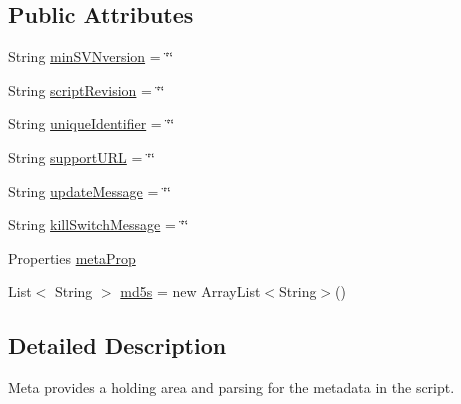 \subsection*{Public Attributes}
\begin{DoxyCompactItemize}
\item 
String \hyperlink{class_c_a_s_u_a_l_1_1caspac_1_1_script_1_1meta_a5d47eed446b14af2514c6937a4202669}{min\-S\-V\-Nversion} = \char`\"{}\char`\"{}
\item 
String \hyperlink{class_c_a_s_u_a_l_1_1caspac_1_1_script_1_1meta_a57752ff86ad97dc0123eaae1555dbfd5}{script\-Revision} = \char`\"{}\char`\"{}
\item 
String \hyperlink{class_c_a_s_u_a_l_1_1caspac_1_1_script_1_1meta_a66b81ac4a19e9bcd67f13776d05c03e9}{unique\-Identifier} = \char`\"{}\char`\"{}
\item 
String \hyperlink{class_c_a_s_u_a_l_1_1caspac_1_1_script_1_1meta_ac61f54a156af56a97ddebc1b97c6de02}{support\-U\-R\-L} = \char`\"{}\char`\"{}
\item 
String \hyperlink{class_c_a_s_u_a_l_1_1caspac_1_1_script_1_1meta_a0a8a286ab3eb83b8a208b20f43ae4f79}{update\-Message} = \char`\"{}\char`\"{}
\item 
String \hyperlink{class_c_a_s_u_a_l_1_1caspac_1_1_script_1_1meta_a481163a34b5bab4b4695228f4630fdd1}{kill\-Switch\-Message} = \char`\"{}\char`\"{}
\item 
Properties \hyperlink{class_c_a_s_u_a_l_1_1caspac_1_1_script_1_1meta_aac6220ea33d812b47fb9bf58ef766fd5}{meta\-Prop}
\item 
List$<$ String $>$ \hyperlink{class_c_a_s_u_a_l_1_1caspac_1_1_script_1_1meta_af599e29e1ca209e600d5c715544823e1}{md5s} = new Array\-List$<$String$>$()
\end{DoxyCompactItemize}


\subsection{Detailed Description}
Meta provides a holding area and parsing for the metadata in the script. 

